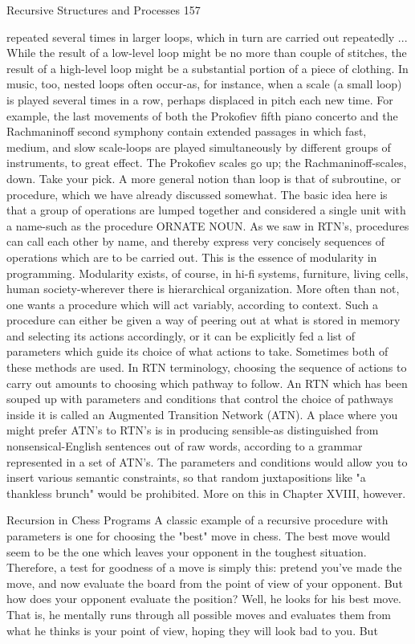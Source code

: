 Recursive Structures and Processes                                                         157

repeated several times in larger loops, which in turn are carried out repeatedly ... While
the result of a low-level loop might be no more than couple of stitches, the result of a
high-level loop might be a substantial portion of a piece of clothing.
        In music, too, nested loops often occur-as, for instance, when a scale (a small
loop) is played several times in a row, perhaps displaced in pitch each new time. For
example, the last movements of both the Prokofiev fifth piano concerto and the
Rachmaninoff second symphony contain extended passages in which fast, medium, and
slow scale-loops are played simultaneously by different groups of instruments, to great
effect. The Prokofiev scales go up; the Rachmaninoff-scales, down. Take your pick.
        A more general notion than loop is that of subroutine, or procedure, which we
have already discussed somewhat. The basic idea here is that a group of operations are
lumped together and considered a single unit with a name-such as the procedure
ORNATE NOUN. As we saw in RTN's, procedures can call each other by name, and
thereby express very concisely sequences of operations which are to be carried out. This
is the essence of modularity in programming. Modularity exists, of course, in hi-fi
systems, furniture, living cells, human society-wherever there is hierarchical
organization.
        More often than not, one wants a procedure which will act variably, according to
context. Such a procedure can either be given a way of peering out at what is stored in
memory and selecting its actions accordingly, or it can be explicitly fed a list of
parameters which guide its choice of what actions to take. Sometimes both of these
methods are used. In RTN terminology, choosing the sequence of actions to carry out
amounts to choosing which pathway to follow. An RTN which has been souped up with
parameters and conditions that control the choice of pathways inside it is called an
Augmented Transition Network (ATN). A place where you might prefer ATN's to RTN's
is in producing sensible-as distinguished from nonsensical-English sentences out of raw
words, according to a grammar represented in a set of ATN's. The parameters and
conditions would allow you to insert various semantic constraints, so that random
juxtapositions like "a thankless brunch" would be prohibited. More on this in Chapter
XVIII, however.


                          Recursion in Chess Programs
A classic example of a recursive procedure with parameters is one for choosing the "best"
move in chess. The best move would seem to be the one which leaves your opponent in
the toughest situation. Therefore, a test for goodness of a move is simply this: pretend
you've made the move, and now evaluate the board from the point of view of your
opponent. But how does your opponent evaluate the position? Well, he looks for his best
move. That is, he mentally runs through all possible moves and evaluates them from what
he thinks is your point of view, hoping they will look bad to you. But




